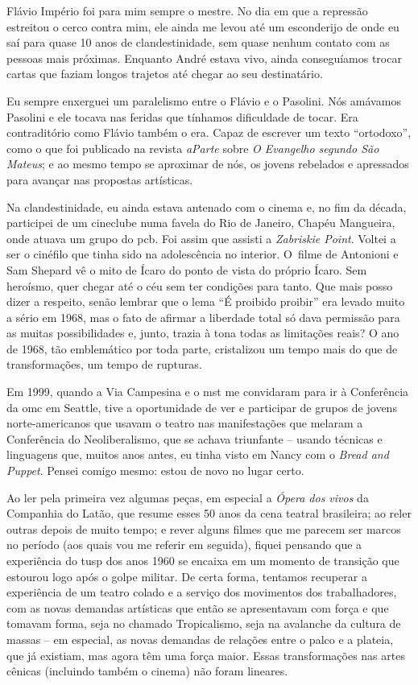 {Flávio Império foi para mim sempre o mestre. No dia em que a repressão
estreitou o cerco contra mim, ele ainda me levou até um esconderijo de
onde eu saí para quase 10 anos de clandestinidade, sem quase nenhum
contato com as pessoas mais próximas. Enquanto André estava vivo, ainda
conseguíamos trocar cartas que faziam longos trajetos até chegar ao seu destinatário.

Eu sempre enxerguei um paralelismo entre o Flávio e o Pasolini. Nós
amávamos Pasolini e ele tocava nas feridas que tínhamos dificuldade de
tocar. Era contraditório como Flávio também o era. Capaz de escrever um
texto “ortodoxo”, como o que foi publicado na revista {\it aParte} sobre
{\it O Evangelho segundo São Mateus}; e ao mesmo tempo se aproximar de
nós, os jovens rebelados e apressados para avançar nas propostas
artísticas.

Na clandestinidade, eu ainda estava antenado com o cinema e, no fim da
década, participei de um cineclube numa favela do Rio de Janeiro,
Chapéu Mangueira, onde atuava um grupo do {\sc pcb}. Foi assim que
assisti a {\it Zabriskie Point}. Voltei a ser o cinéfilo que tinha sido na
adolescência no interior. O~filme de Antonioni e Sam Shepard vê o mito
de Ícaro do ponto de vista do próprio Ícaro. Sem heroísmo, quer chegar
até o céu sem ter condições para tanto. Que mais posso dizer a respeito,
senão lembrar que o lema “É proibido proibir” era levado muito a sério
em 1968, mas o fato de afirmar a liberdade total só dava permissão para as
muitas possibilidades e, junto, trazia à tona todas as limitações reais?
O ano de 1968, tão emblemático por toda parte, cristalizou um tempo mais do que de
transformações, um tempo de rupturas.

Em 1999, quando a Via Campesina e o {\sc mst} me convidaram para ir
à Conferência da {\sc omc} em Seattle, tive a oportunidade de ver e participar
de grupos de jovens norte-americanos que usavam o teatro nas manifestações que
melaram a Conferência do Neoliberalismo, que se achava triunfante --
usando técnicas e linguagens que, muitos anos antes, eu tinha visto em
Nancy com o {\it Bread and Puppet}. Pensei comigo mesmo: estou de
novo no lugar certo.

\subject{***}

Ao ler pela primeira vez algumas peças, em especial a {\it Ópera dos
vivos} da Companhia do Latão, que resume esses 50 anos da cena teatral
brasileira; ao reler outras depois de muito tempo; e rever
alguns filmes que me parecem ser marcos no período (aos quais vou me
referir em seguida), fiquei pensando que a experiência do {\sc tusp} dos anos
1960 se encaixa em um momento de transição que estourou logo após o golpe
militar. De certa forma, tentamos recuperar a experiência de um teatro
colado e a serviço dos movimentos dos trabalhadores, com as novas
demandas artísticas que então se apresentavam com força e que tomavam
forma, seja no chamado Tropicalismo, seja na avalanche da cultura de
massas -- em especial, as novas demandas de relações entre o palco e a
plateia, que já existiam, mas agora têm uma força maior. Essas transformações
nas artes cênicas (incluindo também o cinema) não foram lineares.

}
